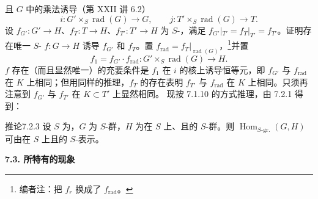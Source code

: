且 $G$ 中的乘法诱导（第 XXII 讲 6.2）
\[i:G'\times_S\operatorname{rad}(G)\longrightarrow G,\qquad j:T'\times_S\operatorname{rad}(G)\longrightarrow T.\]
设 $f_{G'}:G'\to H$、$f_T:T\to H$、$f_{T'}:T'\to H$ 为 $S$-，满足 $f_{G'}|_{T'}=f_T|_{T'}=f_{T'}$。证明存在唯一 $S$- $f:G\to H$ 诱导 $f_{G'}$ 和 $f_T$。置 $f_{\mathrm{rad}}=f_T|_{\operatorname{rad}(G)}$，\footnote{编者注：把 $f_r$ 换成了 $f_{\mathrm{rad}}$。}并置
\[f_1=f_{G'}\cdot f_{\mathrm{rad}}:G'\times_S\operatorname{rad}(G)\longrightarrow H.\]
$f$ 存在（而且显然唯一）的充要条件是 $f_1$ 在 $i$ 的核上诱导恒等元，即 $f_{G'}$ 与 $f_{\mathrm{rad}}$ 在 $K$ 上相同；但用同样的推理，$f_T$ 的存在表明 $f_{T'}$ 与 $f_{\mathrm{rad}}$ 在 $K$ 上相同。只须再注意到 $f_{G'}$ 与 $f_{T'}$ 在 $K\subset T'$ 上显然相同。
现按 7.1.10 的方式推理，由 7.2.1 得到：
\begin{SGAresult}{推论}{7.2.3}
设 $S$ 为，$G$ 为 $S$-群，$H$ 为在 $S$ 上、且的 $S$-群。则 $\operatorname{Hom}_{S\text{-gr.}}(G,H)$ 可由在 $S$ 上且的 $S$-表示。
\end{SGAresult}
\textbf{7.3. 所特有的现象}

